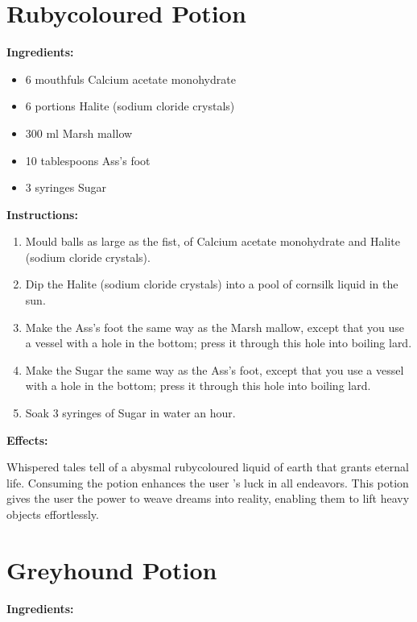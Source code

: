 \documentclass{article}
\begin{document}
\newpage
\section*{Rubycoloured Potion}

\textbf{Ingredients:}

\begin{itemize}
  \item 6 mouthfuls Calcium acetate monohydrate
  \item 6 portions Halite (sodium cloride crystals)
  \item 300 ml Marsh mallow
  \item 10 tablespoons Ass's foot
  \item 3 syringes Sugar
\end{itemize}

\textbf{Instructions:}

\begin{enumerate}
  \item Mould balls as large as the fist, of Calcium acetate monohydrate and Halite (sodium cloride crystals).
  \item Dip the Halite (sodium cloride crystals) into a pool of cornsilk liquid in the sun.
  \item Make the Ass's foot the same way as the Marsh mallow, except that you use a vessel with a hole in the bottom; press it through this hole into boiling lard.
  \item Make the Sugar the same way as the Ass's foot, except that you use a vessel with a hole in the bottom; press it through this hole into boiling lard.
  \item Soak 3 syringes of Sugar in water an hour.
\end{enumerate}

\textbf{Effects:}

Whispered tales tell of a abysmal rubycoloured liquid of earth that grants eternal life. Consuming the potion enhances the user 's luck in all endeavors. This potion gives the user the power to weave dreams into reality, enabling them to lift heavy objects effortlessly.

\newpage
\section*{Greyhound Potion}

\textbf{Ingredients:}
\end{document}
